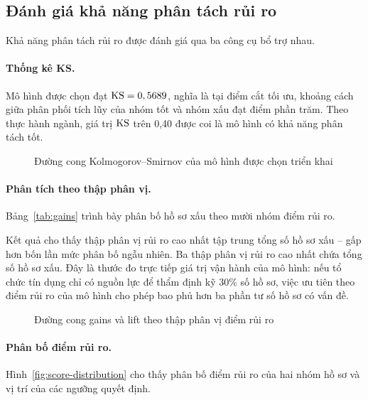 \subsection{Đánh giá khả năng phân tách rủi ro}
\label{subsec:kq-phan-tach}

Khả năng phân tách rủi ro được đánh giá qua ba công cụ bổ trợ nhau.

\paragraph{Thống kê KS.} Mô hình được chọn đạt $\mathrm{KS} = 0,5689{}$, nghĩa là tại
điểm cắt tối ưu, khoảng cách giữa phân phối tích lũy của nhóm tốt và nhóm xấu đạt
\KSPoints{} điểm phần trăm. Theo thực hành ngành, giá trị $\mathrm{KS}$ trên 0,40 được
coi là mô hình có khả năng phân tách tốt.

\begin{figure}[!htbp]
\centering
{}
\caption{Đường cong Kolmogorov--Smirnov của mô hình được chọn triển khai}
\label{fig:ks-curve}
\end{figure}

\paragraph{Phân tích theo thập phân vị.} Bảng~\ref{tab:gains} trình bày phân bố
hồ sơ xấu theo mười nhóm điểm rủi ro.



Kết quả cho thấy thập phân vị rủi ro cao nhất tập trung \TopDecileBad{} tổng số
hồ sơ xấu -- gấp hơn bốn lần mức phân bố ngẫu nhiên. Ba thập phân vị rủi ro cao
nhất chứa \TopThreeDecileBad{} tổng số hồ sơ xấu. Đây là thước đo trực tiếp giá trị vận hành của mô hình:
nếu tổ chức tín dụng chỉ có nguồn lực để thẩm định kỹ 30\% số hồ sơ, việc ưu tiên
theo điểm rủi ro của mô hình cho phép bao phủ hơn ba phần tư số hồ sơ có vấn đề.

\begin{figure}[!htbp]
\centering
{}
\caption{Đường cong gains và lift theo thập phân vị điểm rủi ro}
\label{fig:gains}
\end{figure}

\paragraph{Phân bố điểm rủi ro.} Hình~\ref{fig:score-distribution} cho thấy phân
bố điểm rủi ro của hai nhóm hồ sơ và vị trí của các ngưỡng quyết định.

